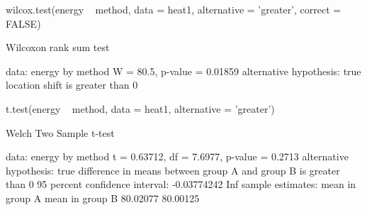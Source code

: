 \documentclass[a4paper]{article}
\begin{document}
\begin{Schunk}
\begin{Sinput}
wilcox.test(energy ~ method, data = heat1, alternative = 'greater', correct = FALSE)
\end{Sinput}
\begin{Soutput}

	Wilcoxon rank sum test

data:  energy by method
W = 80.5, p-value = 0.01859
alternative hypothesis: true location shift is greater than 0
\end{Soutput}
\end{Schunk}
\begin{Schunk}
\begin{Sinput}
t.test(energy ~ method, data = heat1, alternative = 'greater')
\end{Sinput}
\begin{Soutput}

	Welch Two Sample t-test

data:  energy by method
t = 0.63712, df = 7.6977, p-value = 0.2713
alternative hypothesis: true difference in means between group A and group B is greater than 0
95 percent confidence interval:
 -0.03774242         Inf
sample estimates:
mean in group A mean in group B 
       80.02077        80.00125 
\end{Soutput}
\end{Schunk}
\end{document}
